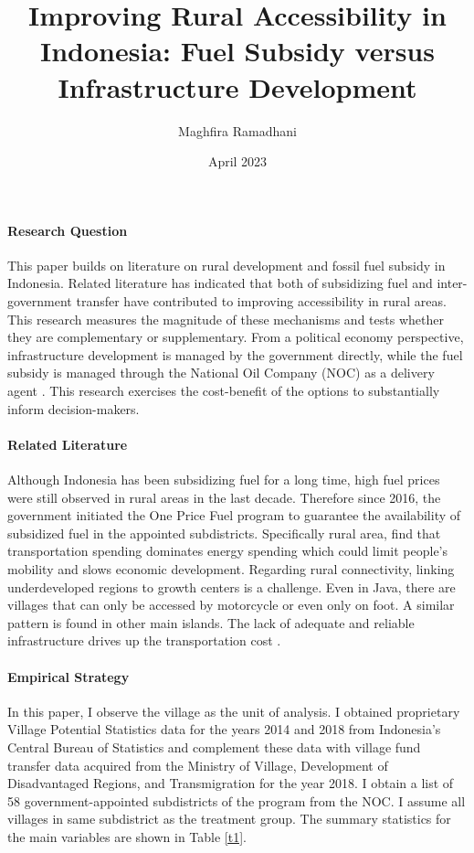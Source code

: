 \documentclass[letterpaper,11pt,leqno]{article}
\begin{document}
\title{Improving Rural Accessibility in Indonesia: Fuel Subsidy versus Infrastructure Development}
\author{Maghfira Ramadhani}
\date{April 2023}       
\maketitle
 
\paragraph{Research Question} This paper builds on literature on rural development and fossil fuel subsidy in Indonesia. Related literature has indicated that both of subsidizing fuel and inter-government transfer have contributed to improving accessibility in rural areas. This research measures the magnitude of these mechanisms and tests whether they are complementary or supplementary. From a political economy perspective, infrastructure development is managed by the government directly, while the fuel subsidy is managed through the National Oil Company (NOC) as a delivery agent \citep{ichsan_2022}. This research exercises the cost-benefit of the options to substantially inform decision-makers.

\paragraph{Related Literature} Although Indonesia has been subsidizing fuel for a long time, high fuel prices were still observed in rural areas in the last decade. Therefore since 2016, the government initiated the One Price Fuel program to guarantee the availability of subsidized fuel in the appointed subdistricts. Specifically rural area, \citet{sambodo_2019} find that transportation spending dominates energy spending which could limit people's mobility and slows economic development. Regarding rural connectivity, linking underdeveloped regions to growth centers is a challenge. Even in Java, there are villages that can only be accessed by motorcycle or even only on foot. A similar pattern is found in other main islands. The lack of adequate and reliable infrastructure drives up the transportation cost \citep{sandee_2016}.


\paragraph{Empirical Strategy} In this paper, I observe the village as the unit of analysis. I obtained proprietary Village Potential Statistics data for the years 2014 and 2018 from Indonesia's Central Bureau of Statistics and complement these data with village fund transfer data acquired from the Ministry of Village, Development of Disadvantaged Regions, and Transmigration for the year 2018. I obtain a list of 58 government-appointed subdistricts of the program from the NOC. I assume all villages in same subdistrict as the treatment group. The summary statistics for the main variables are shown in Table \ref{t1}.
\end{document}
